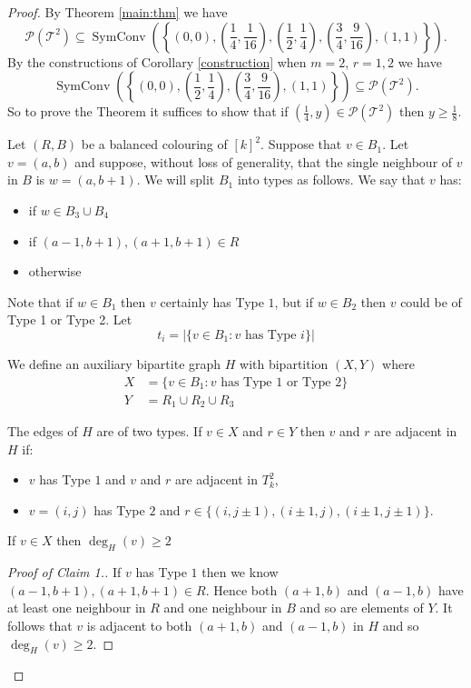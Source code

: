 \documentclass[10pt,a4paper]{amsart}
\DeclareMathOperator{\sch}{SymConv}
\newcommand{\Pcal}{\mathcal P}
\newcommand{\T}{\mathcal T}
\begin{document}
\begin{proof}
By Theorem \ref{main:thm} we have
\[
\Pcal(\T^2)\subseteq\sch\left(\left\{\left(0,0\right),\left(\frac{1}{4},\frac{1}{16}\right),\left(\frac{1}{2},\frac{1}{4}\right),\left(\frac{3}{4},\frac{9}{16}\right),\left(1,1\right)\right\}\right).
\]
By the constructions of Corollary \ref{construction} when $m=2$, $r=1,2$ we have
\[
\sch\left(\left\{\left(0,0\right),\left(\frac{1}{2},\frac{1}{4}\right),\left(\frac{3}{4},\frac{9}{16}\right),\left(1,1\right)\right\}\right)\subseteq\Pcal(\T^2).
\]
So to prove the Theorem it suffices to show that if $(\frac{1}{4},y)\in\Pcal(\T^2)$ then $y\geq\frac{1}{8}$. 

Let $(R,B)$ be a balanced colouring of $[k]^2$. Suppose that $v\in B_1$. Let $v=(a,b)$ and suppose, without loss of generality, that the single neighbour of $v$ in $B$ is $w=(a,b+1)$. We will split $B_1$ into types as follows. We say that $v$ has:

\begin{itemize}
\item[Type 3:] if $w\in B_3\cup B_4$
\item[Type 1:] if $(a-1,b+1),(a+1,b+1)\in R$  
\item[Type 2:] otherwise
\end{itemize}
Note that if $w\in B_1$ then $v$ certainly has Type $1$, but if $w\in B_2$ then $v$ could be of Type 1 or Type 2. Let 
\[
t_i=|\{v\in B_1 : \text{$v$ has Type $i$}\}|
\]

We define an auxiliary bipartite graph $H$ with bipartition $(X,Y)$ where
\begin{align*}
X&=\{ v\in B_1 : \text{$v$ has Type $1$ or Type $2$}\}\\
Y&=R_1\cup R_2\cup R_3
\end{align*}

The edges of $H$ are of two types. If $v\in X$ and $r\in Y$ then $v$ and $r$ are adjacent in $H$ if:
\begin{itemize}
\item $v$ has Type $1$ and $v$ and $r$ are adjacent in $T_k^2$,
\item $v=(i,j)$ has Type $2$ and $r\in\{(i,j\pm1), (i\pm1,j),(i\pm1,j\pm1)\}$.
\end{itemize}

\begin{claim}
If $v\in X$ then $\deg_H(v)\geq 2$
\end{claim}

\begin{proof}[Proof of Claim 1.]
If $v$ has Type $1$ then we know $(a-1,b+1),(a+1,b+1)\in R$. Hence both $(a+1,b)$ and $(a-1,b)$ have at least one neighbour in $R$ and one neighbour in $B$ and so are elements of $Y$. It follows that $v$ is adjacent to both $(a+1,b)$ and $(a-1,b)$ in $H$ and so $\deg_H(v)\geq 2$.


\end{proof}
\end{proof}
\end{document}
